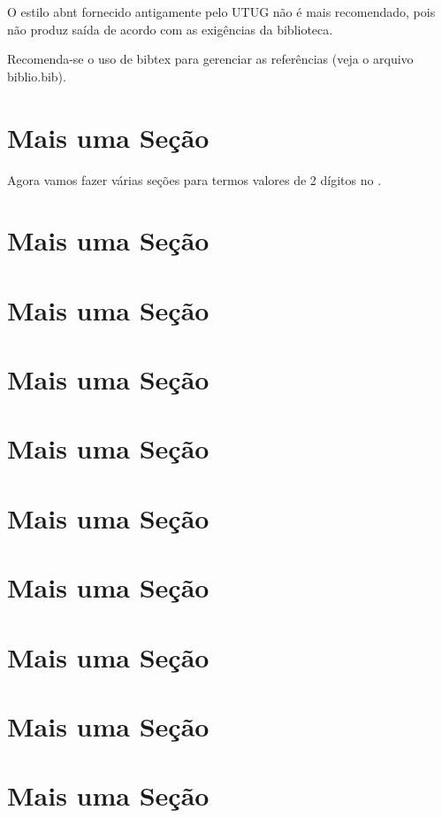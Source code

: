 \documentclass[ecp,tc]{iiufrgs}
\begin{document}
O estilo abnt fornecido antigamente pelo UTUG não é mais recomendado, pois não
produz saída de acordo com as exigências da biblioteca.

Recomenda-se o uso de bibtex para gerenciar as referências (veja o arquivo
biblio.bib).

\section{Mais uma Seção}

Agora vamos fazer várias seções para termos valores de 2 dígitos no \contentsname.

\section{Mais uma Seção}
\section{Mais uma Seção}
\section{Mais uma Seção}
\section{Mais uma Seção}
\section{Mais uma Seção}
\section{Mais uma Seção}
\section{Mais uma Seção}
\section{Mais uma Seção}
\section{Mais uma Seção}
\end{document}
